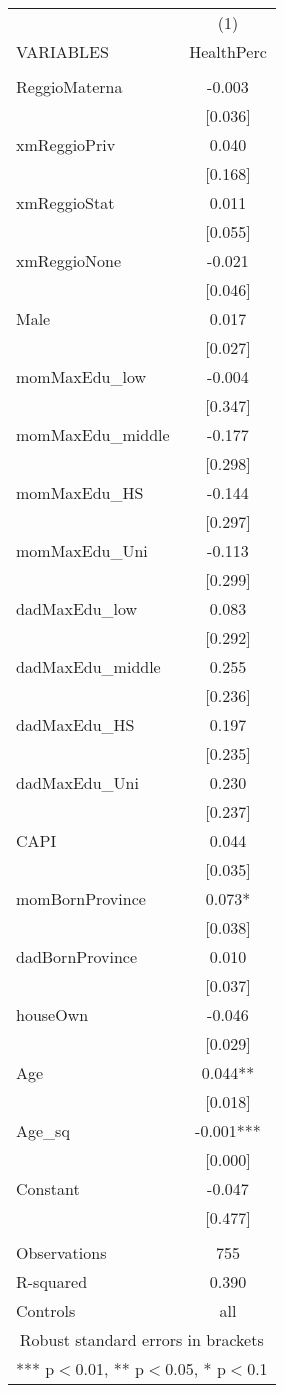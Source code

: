 \documentclass[]{article}
\begin{document}
\begin{tabular}{lc} \hline
 & (1) \\
VARIABLES & HealthPerc \\ \hline
 &  \\
ReggioMaterna & -0.003 \\
 & [0.036] \\
xmReggioPriv & 0.040 \\
 & [0.168] \\
xmReggioStat & 0.011 \\
 & [0.055] \\
xmReggioNone & -0.021 \\
 & [0.046] \\
Male & 0.017 \\
 & [0.027] \\
momMaxEdu\_low & -0.004 \\
 & [0.347] \\
momMaxEdu\_middle & -0.177 \\
 & [0.298] \\
momMaxEdu\_HS & -0.144 \\
 & [0.297] \\
momMaxEdu\_Uni & -0.113 \\
 & [0.299] \\
dadMaxEdu\_low & 0.083 \\
 & [0.292] \\
dadMaxEdu\_middle & 0.255 \\
 & [0.236] \\
dadMaxEdu\_HS & 0.197 \\
 & [0.235] \\
dadMaxEdu\_Uni & 0.230 \\
 & [0.237] \\
CAPI & 0.044 \\
 & [0.035] \\
momBornProvince & 0.073* \\
 & [0.038] \\
dadBornProvince & 0.010 \\
 & [0.037] \\
houseOwn & -0.046 \\
 & [0.029] \\
Age & 0.044** \\
 & [0.018] \\
Age\_sq & -0.001*** \\
 & [0.000] \\
Constant & -0.047 \\
 & [0.477] \\
 &  \\
Observations & 755 \\
R-squared & 0.390 \\
 Controls & all \\ \hline
\multicolumn{2}{c}{ Robust standard errors in brackets} \\
\multicolumn{2}{c}{ *** p$<$0.01, ** p$<$0.05, * p$<$0.1} \\
\end{tabular}
\end{document}
